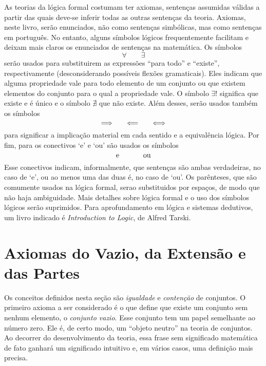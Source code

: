 As teorias da lógica formal costumam ter axiomas, sentenças assumidas válidas a partir das quais deve-se inferir todas as outras sentenças da teoria. Axiomas, neste livro, serão enunciados, não como sentenças simbólicas, mas como sentenças em português. No entanto, alguns símbolos lógicos frequentemente facilitam e deixam mais claros os enunciados de sentenças na matemática. Os símbolos
	\begin{equation*}
	\forall \qquad \exists
	\end{equation*}
serão usados para substituirem as expressões ``para todo'' e ``existe'', respectivamente (desconsiderando possíveis flexões gramaticais). Eles indicam que alguma propriedade vale para todo elemento de um conjunto ou que existem elementos do conjunto para o qual a propriedade vale. O símbolo $\exists!$ significa que existe e é único e o símbolo $\nexists$ que não existe. Além desses, serão usados também os símbolos
	\begin{equation*}
	\quad \Longrightarrow \quad \quad \Longleftarrow \quad \quad \Longleftrightarrow \quad
	\end{equation*}
para significar a implicação material em cada sentido e a equivalência lógica. Por fim, para os conectivos `e' e `ou'  são usados os símbolos
	\begin{equation*}
	\text{\ \ e\ \ } \qquad \text{\ \ ou\ \ }
	\end{equation*}
Esse conectivos indicam, informalmente, que sentenças são ambas verdadeiras, no caso de `e', ou ao menos uma das duas é, no caso de `ou'. Os parênteses, que são comumente usados na lógica formal, serao substituidos por espaços, de modo que não haja ambiguidade. Mais detalhes sobre lógica formal e o uso dos símbolos lógicos serão suprimidos. Para aprofundamento em lógica e sistemas dedutivos, um livro indicado é \emph{Introduction to Logic}, de Alfred Tarski.

\section{Axiomas do Vazio, da Extensão e das Partes}

Os conceitos definidos nesta seção são \emph{igualdade} e \emph{contenção} de conjuntos. O primeiro axioma a ser considerado é o que define que existe um conjunto sem nenhum elemento, o \emph{conjunto vazio}. Esse conjunto tem um papel semelhante ao número zero. Ele é, de certo modo, um ``objeto neutro'' na teoria de conjuntos. Ao decorrer do desenvolvimento da teoria, essa frase sem significado matemática de fato ganhará um significado intuitivo e, em vários casos, uma definição mais precisa.

